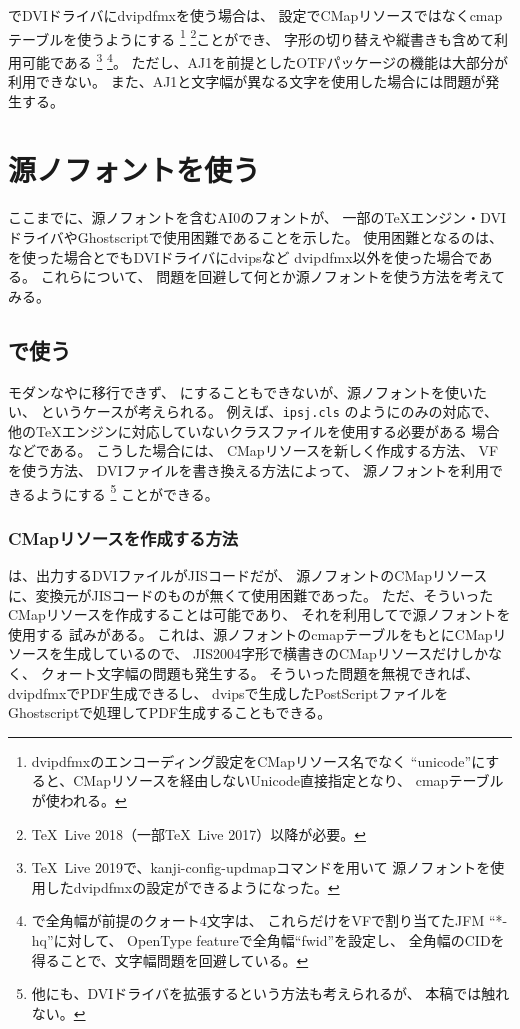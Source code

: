\upTeX でDVIドライバにdvipdfmxを使う場合は、
設定でCMapリソースではなくcmapテーブルを使うようにする
\footnote{dvipdfmxのエンコーディング設定をCMapリソース名でなく
  ``unicode''にすると、CMapリソースを経由しないUnicode直接指定となり、
  cmapテーブルが使われる。}%
\footnote{\TeX \ Live 2018（一部\TeX \ Live 2017）以降が必要。}ことができ、
字形の切り替えや縦書きも含めて利用可能である
\footnote{\TeX \ Live 2019で、kanji-config-updmapコマンドを用いて
  源ノフォントを使用したdvipdfmxの設定ができるようになった。}%
\footnote{\upTeX で全角幅が前提のクォート4文字は、
  これらだけをVFで割り当てたJFM ``*-hq''に対して、
  OpenType featureで全角幅``fwid''を設定し、
  全角幅のCIDを得ることで、文字幅問題を回避している。}。
ただし、AJ1を前提としたOTFパッケージの機能は大部分が利用できない。
また、AJ1と文字幅が異なる文字を使用した場合には問題が発生する。

\section{源ノフォントを使う}

ここまでに、源ノフォントを含むAI0のフォントが、
一部の\TeX エンジン・DVIドライバやGhostscriptで使用困難であることを示した。
使用困難となるのは、\pTeX を使った場合と\upTeX でもDVIドライバにdvipsなど
dvipdfmx以外を使った場合である。
これらについて、
問題を回避して何とか源ノフォントを使う方法を考えてみる。

\subsection{\pTeX で使う}

モダンな\LuaTeX や\XeTeX に移行できず、
\upTeX にすることもできないが、源ノフォントを使いたい、
というケースが考えられる。
例えば、\texttt{ipsj.cls} \cite{ipsj.cls}のように\pLaTeX のみの対応で、
他の\TeX エンジンに対応していないクラスファイルを使用する必要がある
場合などである。
こうした場合には、
CMapリソースを新しく作成する方法、
VFを使う方法、
DVIファイルを書き換える方法によって、
源ノフォントを利用できるようにする
\footnote{他にも、DVIドライバを拡張するという方法も考えられるが、
  本稿では触れない。}
ことができる。

\subsubsection{CMapリソースを作成する方法}

\pTeX は、出力するDVIファイルがJISコードだが、
源ノフォントのCMapリソースに、変換元がJISコードのものが無くて使用困難であった。
ただ、そういったCMapリソースを作成することは可能であり、
それを利用して\pTeX で源ノフォントを使用する
試み\cite{ptex-jis-sourcehan}がある。
これは、源ノフォントのcmapテーブルをもとにCMapリソースを生成しているので、
JIS2004字形で横書きのCMapリソースだけしかなく、
クォート文字幅の問題も発生する。
そういった問題を無視できれば、dvipdfmxでPDF生成できるし、
dvipsで生成したPostScriptファイルを
Ghostscriptで処理してPDF生成することもできる。

